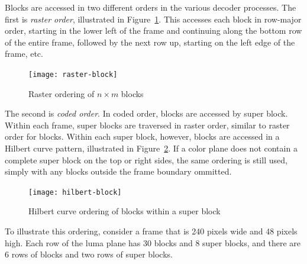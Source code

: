 \documentclass[9pt,letterpaper]{book}
\newcommand{\term}[1]{{\em #1}}
\numberwithin{equation}{chapter}
\numberwithin{figure}{chapter}
\numberwithin{table}{chapter}
\begin{document}
Blocks are accessed in two different orders in the various decoder processes.
The first is \term{raster order}, illustrated in Figure~\ref{fig:raster-block}.
This accesses each block in row-major order, starting in the lower left of the
 frame and continuing along the bottom row of the entire frame, followed by the
 next row up, starting on the left edge of the frame, etc.

\begin{figure}[htbp]
\begin{center}
\texttt{[image: raster-block]}
\end{center}
\caption{Raster ordering of $n\times m$ blocks}
\label{fig:raster-block}
\end{figure}

The second is \term{coded order}.
In coded order, blocks are accessed by super block.
Within each frame, super blocks are traversed in raster order,
 similar to raster order for blocks.
Within each super block, however, blocks are accessed in a Hilbert curve
 pattern, illustrated in Figure~\ref{fig:hilbert-block}.
If a color plane does not contain a complete super block on the top or right
 sides, the same ordering is still used, simply with any blocks outside the
 frame boundary ommitted.

\begin{figure}[htbp]
\begin{center}
\texttt{[image: hilbert-block]}
\end{center}
\caption{Hilbert curve ordering of blocks within a super block}
\label{fig:hilbert-block}
\end{figure}

To illustrate this ordering, consider a frame that is 240 pixels wide and
 48 pixels high.
Each row of the luma plane has 30 blocks and 8 super blocks, and there are 6
 rows of blocks and two rows of super blocks.


\end{document}
